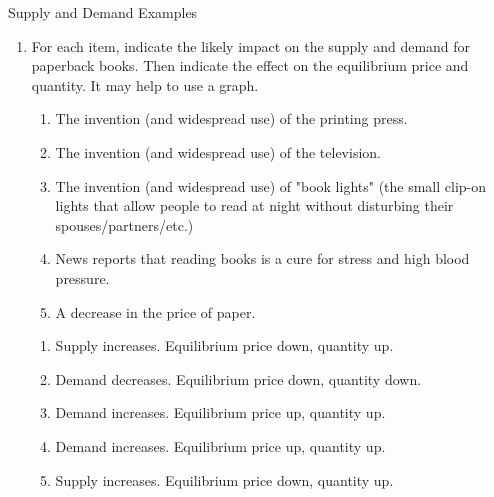 \documentclass{article}
\begin{document}
\begin{center}
{\Large Supply and Demand Examples}
\end{center}
\vspace{1cm}
\thispagestyle{empty}
\begin{enumerate}

\item \begin{EXAM} For each item, indicate the likely impact on the supply and demand for paperback books. Then indicate the effect on the equilibrium price and quantity. It may help to use a graph.

    \begin{enumerate}
    \item The invention (and widespread use) of the printing press. \vspace{1.5cm}
    \item The invention (and widespread use) of the television.\vspace{1.5cm}
    \item The invention (and widespread use) of "book lights" (the small clip-on lights that allow people to read at night without disturbing their spouses/partners/etc.)\vspace{1.5cm}
    \item News reports that reading books is a cure for stress and high blood pressure.\vspace{1.5cm}
    \item A decrease in the price of paper.\vspace{1.5cm}
    \end{enumerate}\end{EXAM}

\begin{KEY}
    \begin{enumerate}
    \item Supply increases. Equilibrium price down, quantity up.
    \item Demand decreases. Equilibrium price down, quantity down.
    \item Demand increases. Equilibrium price up, quantity up.
    \item Demand increases. Equilibrium price up, quantity up.
    \item Supply increases. Equilibrium price down, quantity up.
    \end{enumerate}
\end{KEY}


\begin{comment}
\item \begin{EXAM} For each item, indicate the likely impact on the supply and demand for bulldozer operators and other skilled construction workers. (It may help to think for a moment about who the suppliers and demanders are for these services.) Then indicate the effect on the equilibrium price and quantity. It may help to use a graph.


\end{comment}
\end{enumerate}
\end{document}
